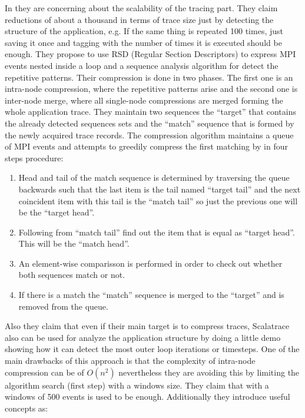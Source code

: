 In \cite{noeth2009scalatrace} they are concerning about the scalability of the
tracing part. They claim reductions of about a
thousand in terms of trace size just by detecting the structure of the
application, e.g. If the same thing is repeated 100 times, just saving it once
and tagging with the number of times it is executed should be enough. They
propose to use RSD (Regular Section Descriptors) to express MPI events nested
inside a loop and a sequence analysis algorithm for detect the repetitive 
patterns. Their compression
is done in two phases. The first one is an intra-node compression, where the
repetitive patterns arise and the second one is inter-node merge, where all
single-node compressions are merged forming the whole application trace.
They maintain two sequences the ``target'' that contains the already detected
sequences sets and the ``match'' sequence that is formed by the newly acquired
trace records. The compression algorithm maintains a queue of MPI events and 
attempts to greedily compress the first matching by  in four steps procedure:
\begin{enumerate}[label=\roman*)]
  \item Head and tail of the match sequence is determined by traversing the
    queue backwards such that the last item is the tail named ``target tail''
    and the next coincident item with this tail is the ``match tail'' so just
    the previous one will be the ``target head''.
  \item Following from ``match tail'' find out the item that is equal as
    ``target head''. This will be the ``match head''.
  \item An element-wise comparisson is performed in order to check out whether 
    both sequences match or not.
  \item If there is a match the ``match'' sequence is merged to the ``target''
    and is removed from the queue.
\end{enumerate}
Also they claim
that even if their main target is to compress traces, Scalatrace also can be
used for analyze the application structure by doing a little demo showing how it
can detect the most outer loop iterations or timesteps. One of the main
drawbacks of this approach is that the complexity of intra-node compression 
can be of $O(n^2)$ nevertheless they are avoiding this by
limiting the algorithm search (first step) with a windows size. They claim that
with a windows of 500 events is used to be enough. 
Additionally they introduce useful concepts as:
